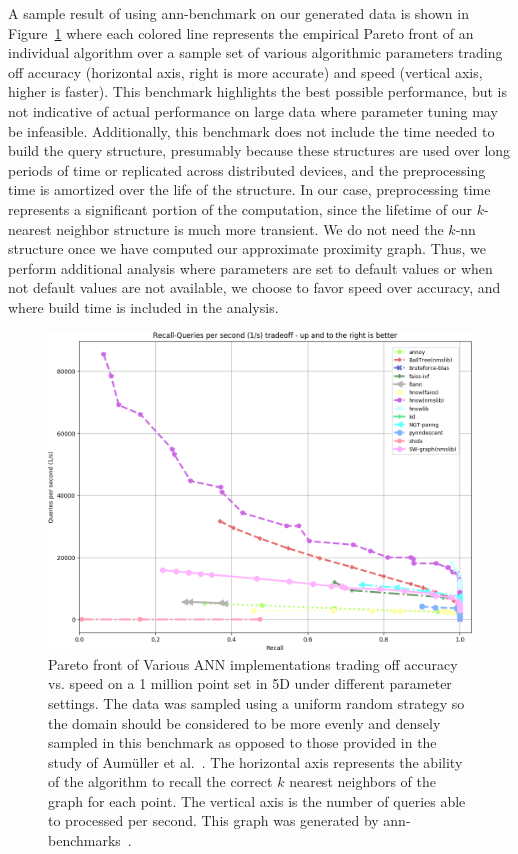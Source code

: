 A sample result of using ann-benchmark on our generated data is shown in Figure~\ref{fig:pareto} where each colored line represents the empirical Pareto front of an individual algorithm over a sample set of various algorithmic parameters trading off accuracy (horizontal axis, right is more accurate) and speed (vertical axis, higher is faster).
%
This benchmark highlights the best possible performance, but is not indicative of actual performance on large data where parameter tuning may be infeasible.
%
Additionally, this benchmark does not include the time needed to build the query structure, presumably because these structures are used over long periods of time or replicated across distributed devices, and the preprocessing time is amortized over the life of the structure.
%
In our case, preprocessing time represents a significant portion of the computation, since the lifetime of our $k$-nearest neighbor structure is much more transient.
%
We do not need the $k$-nn structure once we have computed our approximate proximity graph.
%
Thus, we perform additional analysis where parameters are set to default values or when not default values are not available, we choose to favor speed over accuracy, and where build time is included in the analysis.

\begin{figure}[t]
    \centering
      \includegraphics[width=.95\linewidth]{figs/chap7/uniform-5-euclidean.png}
     \caption[Example performance plot generated by ann-benchmarks]{Pareto front of Various ANN implementations trading off accuracy vs.
       speed on a 1 million point set in 5D under different parameter settings.
       The data was sampled using a uniform random strategy so the domain should be
       considered to be more evenly and densely sampled in this benchmark as
       opposed to those provided in the study of Aum{\"{u}}ller et
       al.~\cite{AumullerBernhardssonFaithfull2018}.
       The horizontal axis represents the ability of the algorithm to recall the
       correct $k$ nearest neighbors of the graph for each point.
       The vertical axis is the number of queries able to  processed per second.
       This graph was generated by ann-benchmarks~\cite{ANNBenchmark}.
     }
    \label{fig:pareto}
\end{figure}

